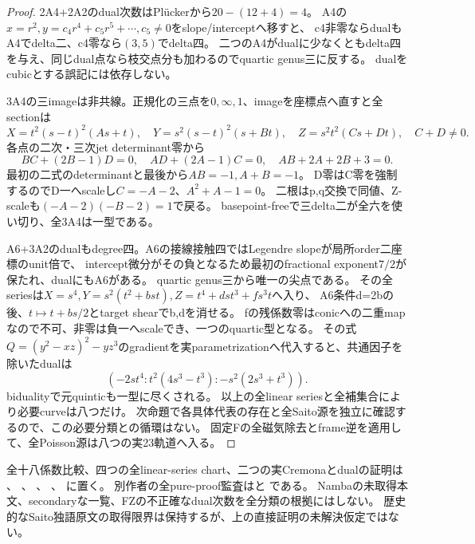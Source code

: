 \documentclass[a4paper,11pt]{ltjsarticle}
\theoremstyle{definition}
\begin{document}
\begin{proof}
2A4+2A2のdual次数はPl\"uckerから$20-(12+4)=4$。
A4の$x=r^2,y=c_4r^4+c_5r^5+\cdots,c_5\ne0$をslope/interceptへ移すと、
c4非零ならdualもA4でdelta二、c4零なら$(3,5)$でdelta四。
二つのA4がdualに少なくともdelta四を与え、同じdual点なら枝交点分も加わるのでquartic genus三に反する。
dualをcubicとする誤記には依存しない。

3A4の三imageは非共線。正規化の三点を$0,\infty,1$、imageを座標点へ直すと全sectionは
\[
 X=t^2(s-t)^2(As+t),\quad Y=s^2(s-t)^2(s+Bt),\quad Z=s^2t^2(Cs+Dt),\quad C+D\ne0.
\]
各点の二次・三次jet determinant零から
\[
 BC+(2B-1)D=0,\quad AD+(2A-1)C=0,\quad AB+2A+2B+3=0.
\]
最初の二式のdeterminantと最後から$AB=-1,A+B=-1$。
D零はC零を強制するのでD一へscaleし$C=-A-2$、$A^2+A-1=0$。
二根はp,q交換で同値、Z-scaleも$(-A-2)(-B-2)=1$で戻る。
basepoint-freeで三delta二が全六を使い切り、全3A4は一型である。

A6+3A2のdualもdegree四。A6の接線接触四ではLegendre slopeが局所order二座標のunit倍で、
intercept微分がその負となるため最初のfractional exponent$7/2$が保たれ、dualにもA6がある。
quartic genus三から唯一の尖点である。
その全seriesは$X=s^4,Y=s^2(t^2+bst),Z=t^4+dst^3+fs^3t$へ入り、
A6条件d=2bの後、$t\mapsto t+bs/2$とtarget shearでb,dを消せる。
fの残係数零はconicへの二重mapなので不可、非零は負一へscaleでき、一つのquartic型となる。
その式$Q=(y^2-xz)^2-yz^3$のgradientを実parametrizationへ代入すると、共通因子を除いたdualは
\[
 (-2st^4:t^2(4s^3-t^3):-s^2(2s^3+t^3)).
\]
bidualityで元quinticも一型に尽くされる。
以上の全linear seriesと全補集合により必要curveは八つだけ。
次命題で各具体代表の存在と全Saito源を独立に確認するので、この必要分類との循環はない。
固定Fの全磁気除去とframe逆を適用して、全Poisson源は八つの実23軌道へ入る。
\end{proof}
全十八係数比較、四つの全linear-series chart、二つの実Cremonaとdualの証明は
、
、
、
、
に置く。
別作者の全pure-proof監査はと
である。
Nambaの未取得本文、secondaryな一覧、FZの不正確なdual次数を全分類の根拠にはしない。
歴史的なSaito独語原文の取得限界は保持するが、上の直接証明の未解決仮定ではない。
\end{document}
